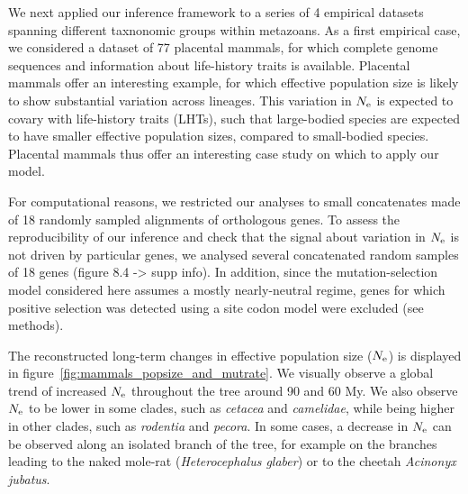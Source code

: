 We next applied our inference framework to a series of 4 empirical datasets spanning different taxnonomic groups within metazoans.
As a first empirical case, we considered a dataset of 77 placental mammals, for which complete genome sequences and information about life-history traits is available.
Placental mammals offer an interesting example, for which effective population size is likely to show substantial variation across lineages.
This variation in $N_{\text{e}}$ is expected to covary with life-history traits (LHTs), such that large-bodied species are expected to have smaller effective population sizes, compared to small-bodied species.
Placental mammals thus offer an interesting case study on which to apply our model.

For computational reasons, we restricted our analyses to small concatenates made of 18 randomly sampled alignments of orthologous genes.
To assess the reproducibility of our inference and check that the signal about variation in $N_{\text{e}}$ is not driven by particular genes, we analysed several concatenated random samples of 18 genes (figure 8.4 -> supp info).
In addition, since the mutation-selection model considered here assumes a mostly nearly-neutral regime, genes for which positive selection was detected using a site codon model were excluded (see methods).

The reconstructed long-term changes in effective population size ($N_{\text{e}}$) is displayed in figure~\ref{fig:mammals_popsize_and_mutrate}.
We visually observe a global trend of increased $N_{\text{e}}$ throughout the tree around 90 and 60 My.
We also observe $N_{\text{e}}$ to be lower in some clades, such as \textit{cetacea} and \textit{camelidae}, while being higher in other clades, such as \textit{rodentia} and \textit{pecora}.
In some cases, a decrease in $N_{\text{e}}$ can be observed along an isolated branch of the tree, for example on the branches leading to the naked mole-rat (\textit{Heterocephalus glaber}) or to the cheetah \textit{Acinonyx jubatus}.

